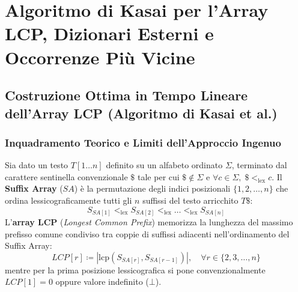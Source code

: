 \chapter{Algoritmo di Kasai per l'Array LCP, Dizionari Esterni e Occorrenze Pi\`u Vicine}
\label{ch:kasai-lcp-dizionari-esterni-occorrenze-vicine}

\FloatBarrier
\section{Costruzione Ottima in Tempo Lineare dell'Array LCP (Algoritmo di Kasai et al.)}
\label{sec:kasai-lcp-construction}

\FloatBarrier
\subsection{Inquadramento Teorico e Limiti dell'Approccio Ingenuo}
\label{subsec:teoria-limiti-ingenuo-lcp}

Sia dato un testo $T[1 \dots n]$ definito su un alfabeto ordinato $\Sigma$, terminato dal carattere sentinella convenzionale $\$$ tale per cui $\$ \notin \Sigma$ e $\forall c \in \Sigma, \; \$ <_{\text{lex}} c$. Il \textbf{Suffix Array} ($SA$) \`e la permutazione degli indici posizionali $\{1, 2, \dots, n\}$ che ordina lessicograficamente tutti gli $n$ suffissi del testo arricchito $T\$$:
\begin{equation}
  S_{SA[1]} <_{\text{lex}} S_{SA[2]} <_{\text{lex}} \dots <_{\text{lex}} S_{SA[n]}
\end{equation}
L'\textbf{array LCP} (\textit{Longest Common Prefix}) memorizza la lunghezza del massimo prefisso comune condiviso tra coppie di suffissi adiacenti nell'ordinamento del Suffix Array:
\begin{equation}
  LCP[r] \coloneqq |\text{lcp}(S_{SA[r]}, S_{SA[r-1]})|, \quad \forall r \in \{2, 3, \dots, n\}
\end{equation}
mentre per la prima posizione lessicografica si pone convenzionalmente $LCP[1] = 0$ oppure valore indefinito ($\bot$).

